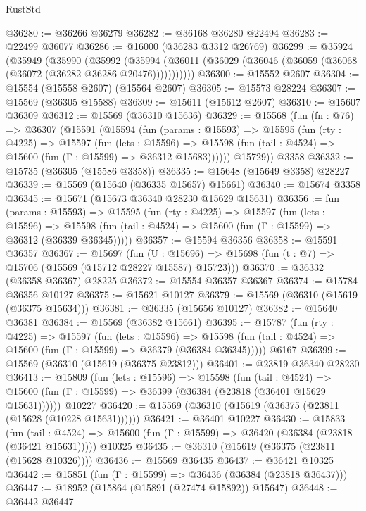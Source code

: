\begin{lexlean}{RustStd}
\begin{coremodule}
@36280 := @36266 @36279
@36282 := @36168 @36280 @22494
@36283 := @22499 @36077
@36286 := @16000 (@36283 @3312 @26769)
@36299 := @35924
    (@35949
      (@35990
        (@35992
          (@35994 (@36011 (@36029 (@36046 (@36059 (@36068 (@36072 (@36282 @36286 @20476)))))))))))
@36300 := @15552 @2607
@36304 := @15554 (@15558 @2607) (@15564 @2607)
@36305 := @15573 @28224
@36307 := @15569 (@36305 @15588)
@36309 := @15611 (@15612 @2607)
@36310 := @15607 @36309
@36312 := @15569 (@36310 @15636)
@36329 := @15568
    (fun (fn : @76) =>
    @36307
      (@15591
        (@15594
          (fun (params : @15593) =>
          @15595
            (fun (rty : @4225) =>
            @15597
              (fun (lets : @15596) =>
              @15598 (fun (tail : @4524) => @15600 (fun (Γ : @15599) => @36312 @15683))))))
        @15729))
    @3358
@36332 := @15735 (@36305 (@15586 @3358))
@36335 := @15648 (@15649 @3358) @28227
@36339 := @15569 (@15640 (@36335 @15657) @15661)
@36340 := @15674 @3358
@36345 := @15671 (@15673 @36340 @28230 @15629 @15631)
@36356 := fun (params : @15593) =>
  @15595
    (fun (rty : @4225) =>
    @15597
      (fun (lets : @15596) =>
      @15598 (fun (tail : @4524) => @15600 (fun (Γ : @15599) => @36312 (@36339 @36345)))))
@36357 := @15594 @36356
@36358 := @15591 @36357
@36367 := @15697
    (fun (U : @15696) => @15698 (fun (t : @7) => @15706 (@15569 (@15712 @28227 @15587) @15723)))
@36370 := @36332 (@36358 @36367) @28225
@36372 := @15554 @36357 @36367
@36374 := @15784 @36356 @10127
@36375 := @15621 @10127
@36379 := @15569 (@36310 (@15619 (@36375 @15634)))
@36381 := @36335 (@15656 @10127)
@36382 := @15640 @36381
@36384 := @15569 (@36382 @15661)
@36395 := @15787
    (fun (rty : @4225) =>
    @15597
      (fun (lets : @15596) =>
      @15598 (fun (tail : @4524) => @15600 (fun (Γ : @15599) => @36379 (@36384 @36345)))))
    @6167
@36399 := @15569 (@36310 (@15619 (@36375 @23812)))
@36401 := @23819 @36340 @28230
@36413 := @15809
    (fun (lets : @15596) =>
    @15598
      (fun (tail : @4524) =>
      @15600 (fun (Γ : @15599) => @36399 (@36384 (@23818 (@36401 @15629 @15631))))))
    @10227
@36420 := @15569 (@36310 (@15619 (@36375 (@23811 (@15628 (@10228 @15631))))))
@36421 := @36401 @10227
@36430 := @15833
    (fun (tail : @4524) => @15600 (fun (Γ : @15599) => @36420 (@36384 (@23818 (@36421 @15631)))))
    @10325
@36435 := @36310 (@15619 (@36375 (@23811 (@15628 @10326))))
@36436 := @15569 @36435
@36437 := @36421 @10325
@36442 := @15851 (fun (Γ : @15599) => @36436 (@36384 (@23818 @36437)))
@36447 := @18952 (@15864 (@15891 (@27474 @15892)) @15647)
@36448 := @36442 @36447

\end{coremodule}
\end{lexlean}
